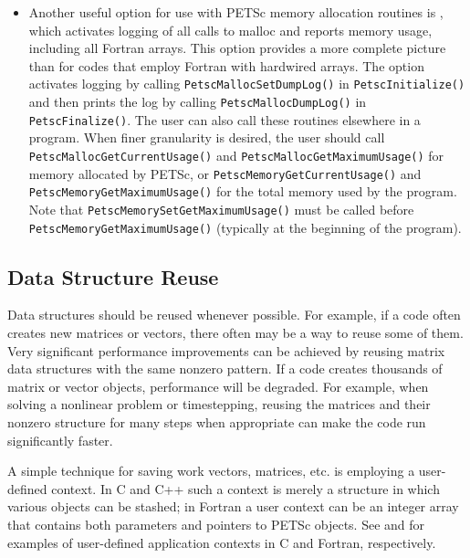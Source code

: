 {{{\begin{itemize}
\item Another useful option for use with PETSc memory allocation
routines is , which activates logging of all calls
to malloc and reports memory usage, including all Fortran arrays.
This option provides a more complete picture than  for
codes that employ Fortran with hardwired arrays.  The option
 activates logging by calling \lstinline{PetscMallocSetDumpLog()} in
\lstinline{PetscInitialize()} and then prints the log by calling \lstinline{PetscMallocDumpLog()}
in \lstinline{PetscFinalize()}.  The user can also call these routines elsewhere in a
program.  When finer granularity is desired, the user should call
\break\lstinline{PetscMallocGetCurrentUsage()} and \lstinline{PetscMallocGetMaximumUsage()} for memory
allocated by PETSc, or \break\lstinline{PetscMemoryGetCurrentUsage()} and
\lstinline{PetscMemoryGetMaximumUsage()} for the total memory used by the program.
Note that \lstinline{PetscMemorySetGetMaximumUsage()} must be called before
\lstinline{PetscMemoryGetMaximumUsage()} (typically at the beginning of the program).
\end{itemize}


\subsection{Data Structure Reuse}
\label{sec_dsreuse}

Data structures should be reused whenever possible.  For example, if a code often
creates new matrices or vectors, there often may be a way to reuse some
of them.  Very significant performance improvements can be achieved by
reusing matrix data structures with the same nonzero pattern.  If a code
creates thousands of matrix or vector objects, performance will be
degraded.  For example, when solving a nonlinear problem or timestepping,
reusing the matrices and their nonzero structure for many steps when
 appropriate can make the code run significantly faster.

A simple technique for saving work vectors, matrices, etc. is employing
a user-defined context.  In C and C++ such a context is merely a
structure in which various objects can be stashed; in Fortran a user
context can be an integer array that contains both parameters and pointers
to PETSc objects. See \href{http://www.mcs.anl.gov/petsc/petsc-current/src/snes/examples/tutorials/ex5.c.html}{} and
\href{http://www.mcs.anl.gov/petsc/petsc-current/src/snes/examples/tutorials/ex5f.F90.html}{} for examples of user-defined application
contexts in C and Fortran, respectively.

}}}
